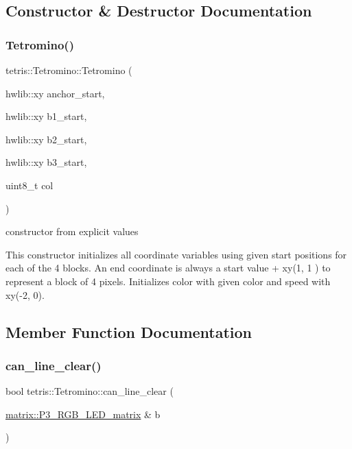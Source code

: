 \subsection{Constructor \& Destructor Documentation}
\mbox{\label{classtetris_1_1Tetromino_a2fd9a4c170a10eeba329abf374cd3f39}} 
\subsubsection{\texorpdfstring{Tetromino()}{Tetromino()}}
{\footnotesize\ttfamily tetris\+::\+Tetromino\+::\+Tetromino (\begin{DoxyParamCaption}\item[{hwlib\+::xy}]{anchor\+\_\+start,  }\item[{hwlib\+::xy}]{b1\+\_\+start,  }\item[{hwlib\+::xy}]{b2\+\_\+start,  }\item[{hwlib\+::xy}]{b3\+\_\+start,  }\item[{uint8\+\_\+t}]{col }\end{DoxyParamCaption})\hspace{0.3cm}{\ttfamily [inline]}}



constructor from explicit values 

This constructor initializes all coordinate variables using given start positions for each of the 4 blocks. An end coordinate is always a start value + xy(1, 1 ) to represent a block of 4 pixels. Initializes color with given color and speed with xy(-\/2, 0). 

\subsection{Member Function Documentation}
\mbox{\label{classtetris_1_1Tetromino_ab2b11138e2d27635d7b7afaaeea58bed}} 
\subsubsection{\texorpdfstring{can\+\_\+line\+\_\+clear()}{can\_line\_clear()}}
{\footnotesize\ttfamily bool tetris\+::\+Tetromino\+::can\+\_\+line\+\_\+clear (\begin{DoxyParamCaption}\item[{\hyperlink{classmatrix_1_1P3__RGB__LED__matrix}{matrix\+::\+P3\+\_\+\+R\+G\+B\+\_\+\+L\+E\+D\+\_\+matrix} \&}]{b }\end{DoxyParamCaption})\hspace{0.3cm}{\ttfamily [inline]}}



